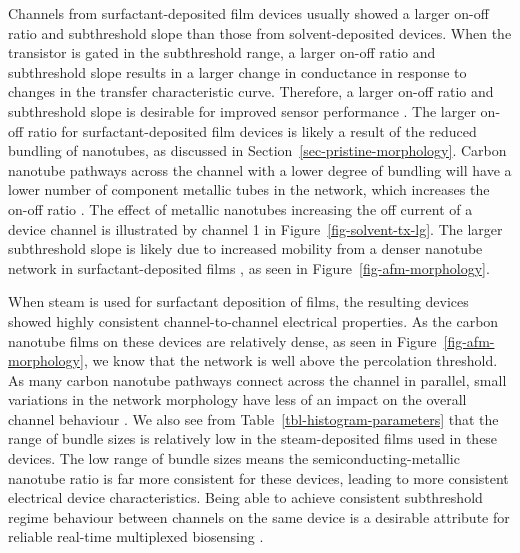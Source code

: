 \documentclass[
  a4paper,
]{scrbook}
\begin{document}
Channels from surfactant-deposited film devices usually showed a larger
on-off ratio and subthreshold slope than those from solvent-deposited
devices. When the transistor is gated in the subthreshold range, a
larger on-off ratio and subthreshold slope results in a larger change in
conductance in response to changes in the transfer characteristic curve.
Therefore, a larger on-off ratio and subthreshold slope is desirable for
improved sensor performance \autocite{Kauffman2008,Heller2009,Gao2010}.
The larger on-off ratio for surfactant-deposited film devices is likely
a result of the reduced bundling of nanotubes, as discussed in
Section~\ref{sec-pristine-morphology}. Carbon nanotube pathways across
the channel with a lower degree of bundling will have a lower number of
component metallic tubes in the network, which increases the on-off
ratio \autocite{LeMieux2008,Rouhi2011,Thanihaichelvan2018}. The effect
of metallic nanotubes increasing the off current of a device channel is
illustrated by channel 1 in Figure~\ref{fig-solvent-tx-lg}. The larger
subthreshold slope is likely due to increased mobility from a denser
nanotube network in surfactant-deposited films \autocite{Rouhi2011}, as
seen in Figure~\ref{fig-afm-morphology}.

When steam is used for surfactant deposition of films, the resulting
devices showed highly consistent channel-to-channel electrical
properties. As the carbon nanotube films on these devices are relatively
dense, as seen in Figure~\ref{fig-afm-morphology}, we know that the
network is well above the percolation threshold. As many carbon nanotube
pathways connect across the channel in parallel, small variations in the
network morphology have less of an impact on the overall channel
behaviour \autocite{Thanihaichelvan2018}. We also see from
Table~\ref{tbl-histogram-parameters} that the range of bundle sizes is
relatively low in the steam-deposited films used in these devices. The
low range of bundle sizes means the semiconducting-metallic nanotube
ratio is far more consistent for these devices, leading to more
consistent electrical device characteristics. Being able to achieve
consistent subthreshold regime behaviour between channels on the same
device is a desirable attribute for reliable real-time multiplexed
biosensing \autocite{Kauffman2008,Heller2009,Gao2010}.
\end{document}
